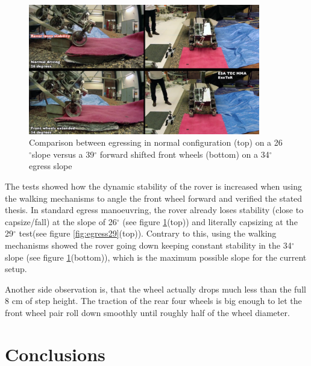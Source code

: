 \documentclass[a4paper,twocolumn]{esapub2005} %
\begin{document}
\begin{figure}[h!]
	\centering		\includegraphics[width=0.9\textwidth]{egress34.png}	
	\caption{Comparison between egressing in normal configuration (top)  on a 26$^{\circ}$slope versus a 39$^{\circ}$ forward shifted front wheels (bottom) on a 34$^{\circ}$ egress slope}
	\label{fig:egress34}
\end{figure}

The tests showed how the dynamic stability of the rover is increased when using the walking mechanisms to angle the front wheel forward and verified the stated thesis.  In standard egress manoeuvring, the rover already loses stability (close to capsize/fall) at the slope of 26$^\circ$ (see figure \ref{fig:egress34}(top)) and literally capsizing at the 29$^\circ$ test(see figure \ref{fig:egress29}(top)). Contrary to this, using the walking mechanisms showed the rover going down keeping constant stability in the 34$^\circ$ slope (see figure \ref{fig:egress34}(bottom)), which is the maximum possible slope for the current setup. 

Another side observation is, that the wheel actually drops much less than the full 8 cm of step height. The traction of the rear four wheels is big enough to let the front wheel pair roll down smoothly until roughly half of the wheel diameter.




\section{Conclusions}
\end{document}

